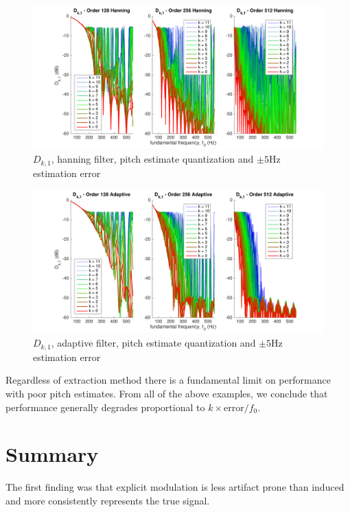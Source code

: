 \documentclass [11pt, proquest,oneside] {ganter_thesis}[2015/03/03]
\begin{document}
\begin{figure}[!ht]
  \centering
    \includegraphics[width=1\textwidth]{pitch_d_ki_1_error5}
    \caption{$D_{k,1}$, hanning filter, pitch estimate quantization and $\pm5$Hz estimation error}\label{fig:pitch_d_ki_1_error5}
\end{figure}

\begin{figure}[!ht]
  \centering
    \includegraphics[width=1\textwidth]{pitch_d_ki_2_error5}
    \caption{$D_{k,1}$, adaptive filter, pitch estimate quantization and $\pm5$Hz estimation error}\label{fig:pitch_d_ki_2_error5}
\end{figure}

Regardless of extraction method there is a fundamental limit on performance with poor pitch estimates.  From all of the above examples, we conclude that performance generally degrades proportional to $k \times \mathrm{error} / f_0$.

\section{Summary}

The first finding was that explicit modulation is less artifact prone than induced and more consistently represents the true signal.
\end{document}
